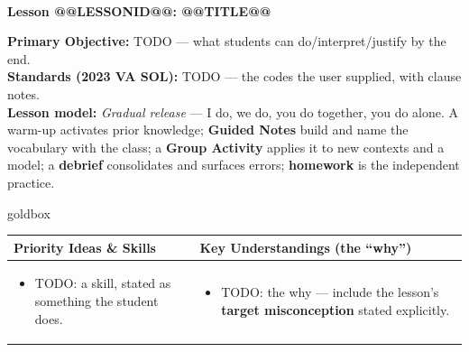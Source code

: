 \documentclass[10pt]{article}
\makeatletter
\newcommand{\LessonNumberName}{Lesson @@LESSONID@@: @@TITLE@@}
\makeatother
\begin{document}
\begin{center}
    {\Large\bfseries \CourseName \\
    {\small\bfseries \UnitNumberName \LessonNumberName}}
\end{center}

\begin{tcolorbox}[colback=forestbg, colframe=forest, boxrule=0.9pt, arc=2mm,
    left=2mm, right=2mm, top=1.5mm, bottom=1.5mm]
    \textbf{Primary Objective:} TODO --- what students can do/interpret/justify by the end.
    \\[2pt]
    \textbf{Standards (2023 VA SOL):} TODO --- the codes the user supplied, with clause notes.
    \\[2pt]
    \textbf{Lesson model:} \emph{Gradual release} --- I do, we do, you do together, you do alone. A
    warm-up activates prior knowledge; \textbf{Guided Notes} build and name the vocabulary with the
    class; a \textbf{Group Activity} applies it to new contexts and a model; a \textbf{debrief}
    consolidates and surfaces errors; \textbf{homework} is the independent practice.
\end{tcolorbox}

\renewcommand{\arraystretch}{1.4}
\begin{skillbox}{goldbox}
\begin{tabularx}{\linewidth}{@{}X|X@{}}
\textbf{Priority Ideas \& Skills} & \textbf{Key Understandings (the ``why'')} \\[2pt]
\hline
\vspace{-6pt}
\begin{itemize}[leftmargin=1.1em, nosep, after=\vspace{2pt}]
  \item TODO: a skill, stated as something the student does.
\end{itemize}
&
\vspace{-6pt}
\begin{itemize}[leftmargin=1.1em, nosep, after=\vspace{2pt}]
  \item TODO: the why --- include the lesson's \textbf{target misconception} stated explicitly.
\end{itemize}
\end{tabularx}
\end{skillbox}
\end{document}
